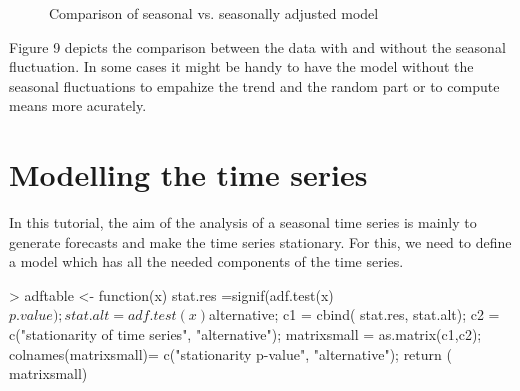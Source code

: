 \documentclass[10pt, a4paper]{article} %
\begin{document}
\begin{figure}[ht]
\begin{center}
\qquad
{}
\end{center}
\caption{Comparison of seasonal vs. seasonally adjusted model}
\label{seasadj}
\end{figure}

\noindent Figure 9 depicts the comparison between the data with and without the seasonal fluctuation. In some cases it might be handy to have the model without the seasonal fluctuations to empahize the trend and the random part or to compute means more acurately.  


\section{Modelling the time series}
In this tutorial, the aim of the analysis of a seasonal time series is mainly  to generate forecasts  and make the time series stationary. For this, we need to define a model which has all the needed components of the time series. 

\begin{Schunk}
\begin{Sinput}
> adftable <- function(x) {
 stat.res =signif(adf.test(x)$p.value);
 stat.alt = adf.test(x)$alternative;
 c1 = cbind( stat.res, stat.alt);
 c2 = c("stationarity of time series",
         "alternative");
 matrixsmall = as.matrix(c1,c2);
 colnames(matrixsmall)= c("stationarity p-value",
         "alternative");
 return ( matrixsmall)
 }
\end{Sinput}
\end{Schunk}
\end{document}
